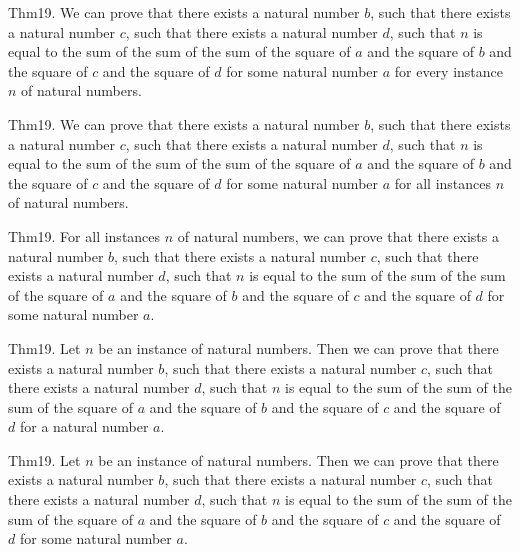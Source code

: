 \documentclass{article}
\begin{document}
Thm19. We can prove that there exists a natural number $b$, such that there exists a natural number $c$, such that there exists a natural number $d$, such that $n$ is equal to the sum of the sum of the sum of the square of $a$ and the square of $b$ and the square of $c$ and the square of $d$ for some natural number $a$ for every instance $n$ of natural numbers.

Thm19. We can prove that there exists a natural number $b$, such that there exists a natural number $c$, such that there exists a natural number $d$, such that $n$ is equal to the sum of the sum of the sum of the square of $a$ and the square of $b$ and the square of $c$ and the square of $d$ for some natural number $a$ for all instances $n$ of natural numbers.

Thm19. For all instances $n$ of natural numbers, we can prove that there exists a natural number $b$, such that there exists a natural number $c$, such that there exists a natural number $d$, such that $n$ is equal to the sum of the sum of the sum of the square of $a$ and the square of $b$ and the square of $c$ and the square of $d$ for some natural number $a$.

Thm19. Let $n$ be an instance of natural numbers. Then we can prove that there exists a natural number $b$, such that there exists a natural number $c$, such that there exists a natural number $d$, such that $n$ is equal to the sum of the sum of the sum of the square of $a$ and the square of $b$ and the square of $c$ and the square of $d$ for a natural number $a$.

Thm19. Let $n$ be an instance of natural numbers. Then we can prove that there exists a natural number $b$, such that there exists a natural number $c$, such that there exists a natural number $d$, such that $n$ is equal to the sum of the sum of the sum of the square of $a$ and the square of $b$ and the square of $c$ and the square of $d$ for some natural number $a$.
\end{document}
